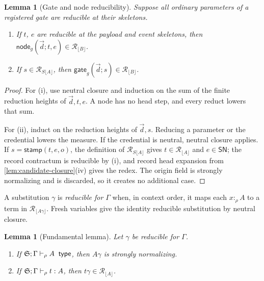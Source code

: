 \documentclass[11pt]{article}
\numberwithin{equation}{section}
\theoremstyle{definition}
\theoremstyle{plain}
\newtheorem{lemma}[definition]{Lemma}
\theoremstyle{remark}
\newcommand{\jtype}{\mathrel{\mathsf{type}}}
\begin{document}
\begin{lemma}[Gate and node reducibility]\label{lem:gate-reducibility}
Suppose all ordinary parameters of a registered gate are reducible at their
skeletons.
\begin{enumerate}[label=(\roman*),leftmargin=2.5em]
\item If \(t\), \(e\) are reducible at the payload and event skeletons, then
\(\mathsf{node}_g(\vec d;t,e)\in\mathcal R_{\lfloor B\rfloor}\).
\item If \(s\in\mathcal R_{S\lfloor A\rfloor}\), then
\(\mathsf{gate}_g(\vec d;s)\in\mathcal R_{\lfloor B\rfloor}\).
\end{enumerate}
\end{lemma}

\begin{proof}
For (i), use neutral closure and induction on the sum of the finite reduction
heights of \(\vec d,t,e\).  A node has no head step, and every reduct lowers
that sum.

For (ii), induct on the reduction heights of \(\vec d,s\).  Reducing a
parameter or the credential lowers the measure.  If the credential is
neutral, neutral closure applies.  If
\(s=\mathsf{stamp}(t,e,o)\), the definition of
\(\mathcal R_{S\lfloor A\rfloor}\) gives
\(t\in\mathcal R_{\lfloor A\rfloor}\) and \(e\in\mathsf{SN}\); the record
contractum is reducible by (i), and record head expansion from
\cref{lem:candidate-closure}(iv) gives the redex.  The origin field is strongly
normalizing and is discarded, so it creates no additional case.
\end{proof}

A substitution \(\gamma\) is \emph{reducible for \(\Gamma\)} when, in
context order, it maps each \(x:_{\rho}A\) to a term in
\(\mathcal R_{\lfloor A\gamma\rfloor}\).  Fresh variables give the identity
reducible substitution by neutral closure.

\begin{lemma}[Fundamental lemma]\label{lem:fundamental}
Let \(\gamma\) be reducible for \(\Gamma\).
\begin{enumerate}[label=(\roman*),leftmargin=2.5em]
\item If \(\AFDeclSignature;\Gamma\vdash_{\rho} A\;\jtype\), then \(A\gamma\) is
strongly normalizing.
\item If \({\mathfrak S};\Gamma\vdash_{\rho} t:A\), then
\(t\gamma\in\mathcal R_{\lfloor A\rfloor}\).
\end{enumerate}
\end{lemma}
\end{document}
